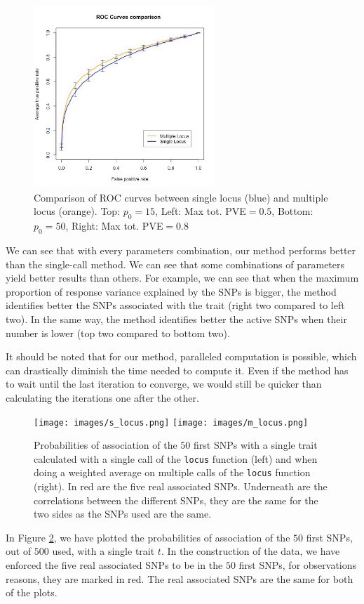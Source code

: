 \documentclass[a4paper, 11pt]{report}
\numberwithin{equation}{chapter}
\begin{document}
\begin{figure}[h!]
\includegraphics[width=2.7in, bb= 0 0 1.7in 1.7in]{images/ROC_Comp_p0_50_var_0_8.jpeg}
\caption{\label{fig:ROCComp}Comparison of ROC curves between single locus (blue) and multiple locus (orange). Top: $p_0 = 15$, Left: Max tot. PVE$ = 0.5$,
Bottom: $p_0 = 50$, Right: Max tot. PVE$ = 0.8$}
\end{figure}

We can see that with every parameters combination, our method performs better than the single-call method. We can see that some combinations of parameters yield better results than others. For example, we can see that when the maximum proportion of response variance explained by the SNPs is bigger, the method identifies better the SNPs associated with the trait (right two compared to left two). In the same way, the method identifies better the active SNPs when their number is lower (top two compared to bottom two).


It should be noted that for our method, paralleled computation is possible, which can drastically diminish the time needed to compute it. Even if the method has to wait until the last iteration to converge, we would still be quicker than calculating the iterations one after the other.

\begin{center}
\begin{figure}[h]
\texttt{[image: images/s\_locus.png]}
\texttt{[image: images/m\_locus.png]}
\caption{\label{fig:simple_locus}Probabilities of association of the $50$ first SNPs with a single trait calculated with a single call of the \texttt{locus} function (left) and when doing a weighted average on multiple calls of the \texttt{locus} function (right). In red are the five real associated SNPs. Underneath are the correlations between the different SNPs, they are the same for the two sides as the SNPs used are the same.}
\end{figure}
\end{center}
In Figure \ref{fig:simple_locus}, we have plotted the probabilities of association of the $50$ first SNPs, out of $500$ used, with a single trait $t$. In the construction of the data, we have enforced the five real associated SNPs to be in the $50$ first SNPs, for observations reasons, they are marked in red. The real associated SNPs are the same for both of the plots.
\end{document}
